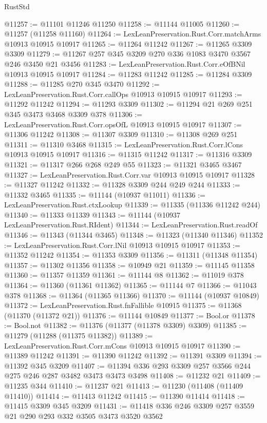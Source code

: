 \begin{lexlean}{RustStd}
\begin{coremodule}
{{{{{{{{{{{{{{{{{{{@11257 := @11101 @11246 @11250
@11258 := @11144 @11005
@11260 := @11257 (@11258 @11160)
@11264 := LexLeanPreservation.Rust.Corr.matchArms @10913 @10915 @10917
@11265 := @11264 @11242
@11267 := @11265 @3309 @3309
@11279 := @11267 @257 @345 @3209 @270 @336 @1083 @3470 @3567 @246 @3450 @21 @3456
@11283 := LexLeanPreservation.Rust.Corr.eOfBNil @10913 @10915 @10917
@11284 := @11283 @11242
@11285 := @11284 @3309
@11288 := @11285 @270 @345 @3470
@11292 := LexLeanPreservation.Rust.Corr.callOps @10913 @10915 @10917
@11293 := @11292 @11242
@11294 := @11293 @3309
@11302 := @11294 @21 @269 @251 @345 @3473 @3468 @3309 @378
@11306 := LexLeanPreservation.Rust.Corr.opsOfL @10913 @10915 @10917
@11307 := @11306 @11242
@11308 := @11307 @3309
@11310 := @11308 @269 @251
@11311 := @11310 @3468
@11315 := LexLeanPreservation.Rust.Corr.lCons @10913 @10915 @10917
@11316 := @11315 @11242
@11317 := @11316 @3309
@11321 := @11317 @266 @268 @249 @55
@11323 := @11321 @3465 @3467
@11327 := LexLeanPreservation.Rust.Corr.var @10913 @10915 @10917
@11328 := @11327 @11242
@11332 := @11328 @3309 @244 @249 @244
@11333 := @11332 @3465
@11335 := @11144 (@10937 @11011)
@11336 := LexLeanPreservation.Rust.ctxLookup
@11339 := @11335 (@11336 @11242 @244)
@11340 := @11333 @11339
@11343 := @11144 (@10937 LexLeanPreservation.Rust.RIdent)
@11344 := LexLeanPreservation.Rust.readOf
@11346 := @11343 (@11344 @3465)
@11348 := @11323 (@11340 @11346)
@11352 := LexLeanPreservation.Rust.Corr.lNil @10913 @10915 @10917
@11353 := @11352 @11242
@11354 := @11353 @3309
@11356 := @11311 (@11348 @11354)
@11357 := @11302 @11356
@11358 := @10949 @21
@11359 := @11145 @11358
@11360 := @11357 @11359
@11361 := @11144 @8
@11362 := @11019 @378
@11364 := @11360 (@11361 @11362)
@11365 := @11144 @7
@11366 := @11043 @378
@11368 := @11364 (@11365 @11366)
@11370 := @11144 (@10937 @10849)
@11372 := LexLeanPreservation.Rust.fnFallible @10915
@11375 := @11368 (@11370 (@11372 @21))
@11376 := @11144 @10849
@11377 := Bool.or
@11378 := Bool.not
@11382 := @11376 (@11377 (@11378 @3309) @3309)
@11385 := @11279 (@11288 (@11375 @11382))
@11389 := LexLeanPreservation.Rust.Corr.mCons @10913 @10915 @10917
@11390 := @11389 @11242
@11391 := @11390 @11242
@11392 := @11391 @3309
@11394 := @11392 @345 @3209
@11407 := @11394 @336 @293 @3309 @257 @3566 @244 @275 @246 @287 @3482 @3473 @3473 @3498
@11408 := @11232 @21
@11409 := @11235 @344
@11410 := @11237 @21
@11413 := @11230 (@11408 (@11409 @11410))
@11414 := @11413 @11242
@11415 := @11390 @11414
@11418 := @11415 @3309 @345 @3209
@11431 := @11418 @336 @246 @3309 @257 @3559 @21 @290 @293 @332 @3505 @3473 @3520 @3562
}}}}}}}}}}}}}}}}}}}
\end{coremodule}
\end{lexlean}
